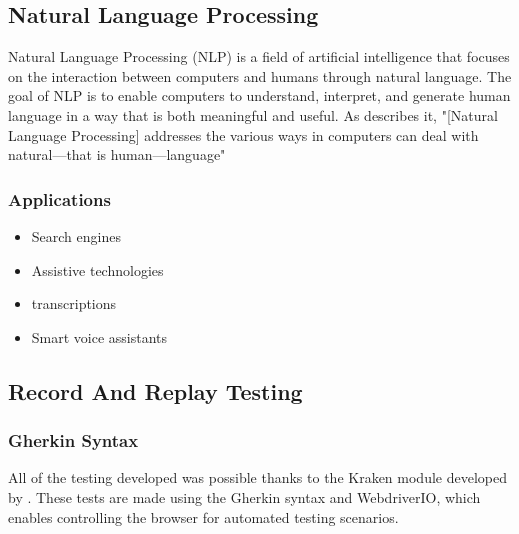 \subsection{Natural Language Processing}

Natural Language Processing (NLP) is a field of artificial intelligence that focuses on the interaction between computers and humans through natural language. The goal of NLP is to enable computers to understand, interpret, and generate human language in a way that is both meaningful and useful. As \cite{book:3382520} describes it, "[Natural Language Processing] addresses the various ways in computers can deal with natural—that is human—language"


\subsubsection{Applications}

\begin{itemize}
    \item Search engines
    \item Assistive technologies
    \item transcriptions
    \item Smart voice assistants
\end{itemize}


\subsection{Record And Replay Testing}


\subsubsection{Gherkin Syntax}

All of the testing developed was possible thanks to the Kraken module developed by \cite{ravelo2023kraken}. These tests are made using the Gherkin syntax and WebdriverIO, which enables controlling the browser for automated testing scenarios.



